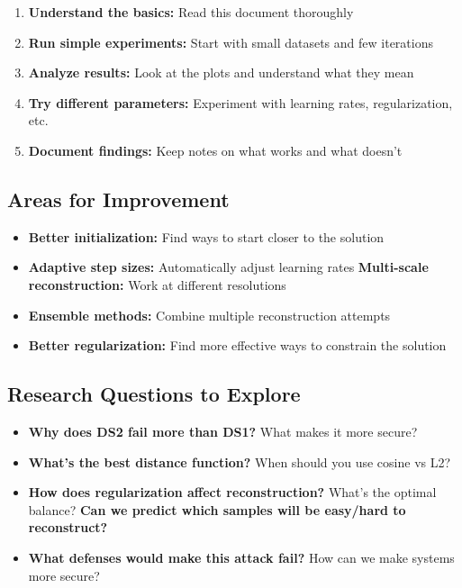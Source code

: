 \documentclass[12pt]{article}
\begin{document}
\begin{enumerate}
    \item \textbf{Understand the basics:} Read this document thoroughly
    \item \textbf{Run simple experiments:} Start with small datasets and few iterations
    \item \textbf{Analyze results:} Look at the plots and understand what they mean
    \item \textbf{Try different parameters:} Experiment with learning rates, regularization, etc.
    \item \textbf{Document findings:} Keep notes on what works and what doesn't
\end{enumerate}

\subsection{Areas for Improvement}

\begin{itemize}
    \item \textbf{Better initialization:} Find ways to start closer to the solution
    \item \textbf{Adaptive step sizes:} Automatically adjust learning rates
    \textbf{Multi-scale reconstruction:} Work at different resolutions
    \item \textbf{Ensemble methods:} Combine multiple reconstruction attempts
    \item \textbf{Better regularization:} Find more effective ways to constrain the solution
\end{itemize}

\subsection{Research Questions to Explore}

\begin{itemize}
    \item \textbf{Why does DS2 fail more than DS1?} What makes it more secure?
    \item \textbf{What's the best distance function?} When should you use cosine vs L2?
    \item \textbf{How does regularization affect reconstruction?} What's the optimal balance?
    \textbf{Can we predict which samples will be easy/hard to reconstruct?}
    \item \textbf{What defenses would make this attack fail?} How can we make systems more secure?
\end{itemize}
\end{document}
